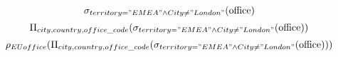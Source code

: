 \documentclass[12pt,a4paper,oneside,onecolumn]{article}
\begin{document}
 
    \[
        \sigma_{territory = "EMEA" \land City \neq "London"}(\text{office})
    \]
    \[
        \Pi_{city, country, office\_code}( \sigma_{territory = "EMEA" \land City \neq "London"}(\text{office}))
    \]
    \[
        \rho_{EUoffice} (\Pi_{city, country, office\_code}( \sigma_{territory = "EMEA" \land City \neq "London"}(\text{office})))
    \]
	
\end{document}
